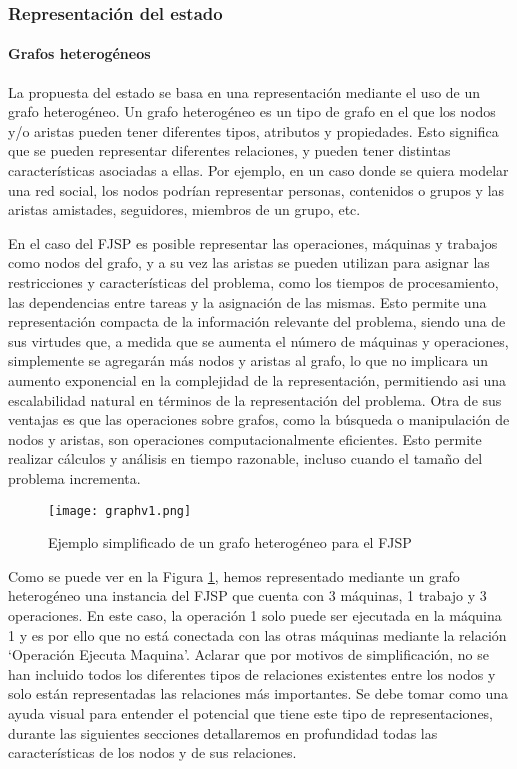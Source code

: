 \subsubsection{Representación del estado}
\paragraph{Grafos heterogéneos}
La propuesta del estado se basa en una representación mediante el uso de un grafo heterogéneo. Un grafo 
heterogéneo es un tipo de grafo en el que los nodos y/o aristas pueden tener diferentes tipos, atributos 
y propiedades. Esto significa que se pueden representar diferentes relaciones, y pueden tener distintas 
características asociadas a ellas. Por ejemplo, en un caso donde se quiera modelar una red social, 
los nodos podrían representar personas, contenidos o grupos y las aristas amistades, seguidores, 
miembros de un grupo, etc.\medskip 

En el caso del FJSP es posible representar las operaciones, máquinas y trabajos como nodos del grafo, 
y a su vez las aristas se pueden utilizan para asignar las restricciones y características del problema, como los tiempos de 
procesamiento, las dependencias entre tareas y la asignación de las mismas. Esto permite una representación 
compacta de la información relevante del problema, siendo una de sus virtudes que, a medida que se aumenta 
el número de máquinas y operaciones, simplemente se agregarán más nodos y aristas al grafo, lo que no 
implicara un aumento exponencial en la complejidad de la representación, permitiendo asi una escalabilidad 
natural en términos de la representación del problema. Otra de sus ventajas es que las operaciones sobre 
grafos, como la búsqueda o manipulación de nodos y aristas, son operaciones computacionalmente eficientes. 
Esto permite realizar cálculos y análisis en tiempo razonable, incluso cuando el tamaño del problema incrementa. 

\begin{figure}[ht]
    \centering
    \texttt{[image: graphv1.png]}
    \caption{Ejemplo simplificado de un grafo heterogéneo para el FJSP}
    \label{fig:grafo-heterogeneo}
\end{figure}

Como se puede ver en la Figura \ref{fig:grafo-heterogeneo}, hemos representado mediante un grafo
heterogéneo una instancia del FJSP que cuenta con 3 máquinas, 1 trabajo y 3 operaciones. En este caso, 
la operación 1 solo puede ser ejecutada en la máquina 1 y es por ello que no está conectada con 
las otras máquinas mediante la relación `Operación Ejecuta Maquina'. Aclarar que por motivos de 
simplificación, no se han incluido todos los diferentes tipos de relaciones existentes entre 
los nodos y solo están representadas las relaciones más importantes. Se debe tomar como una ayuda 
visual para entender el potencial que tiene este tipo de representaciones, durante las siguientes 
secciones detallaremos en profundidad todas las características de los nodos y de sus relaciones.

